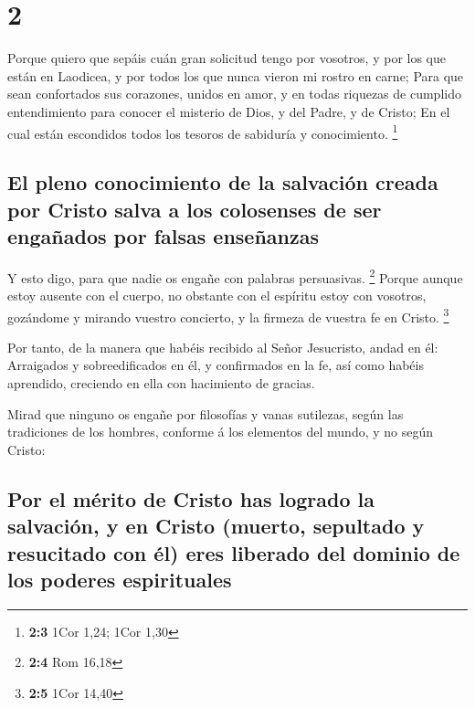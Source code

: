 \hypertarget{section-1}{%
\section{2}\label{section-1}}

 Porque quiero que sepáis cuán gran solicitud tengo por
vosotros, y por los que están en Laodicea, y por todos los que nunca
vieron mi rostro en carne;  Para que sean confortados sus
corazones, unidos en amor, y en todas riquezas de cumplido entendimiento
para conocer el misterio de Dios, y del Padre, y de Cristo; 
En el cual están escondidos todos los tesoros de sabiduría y
conocimiento. \footnote{\textbf{2:3} 1Cor 1,24; 1Cor 1,30}

\hypertarget{el-pleno-conocimiento-de-la-salvaciuxf3n-creada-por-cristo-salva-a-los-colosenses-de-ser-engauxf1ados-por-falsas-enseuxf1anzas}{%
\subsection{El pleno conocimiento de la salvación creada por Cristo
salva a los colosenses de ser engañados por falsas
enseñanzas}\label{el-pleno-conocimiento-de-la-salvaciuxf3n-creada-por-cristo-salva-a-los-colosenses-de-ser-engauxf1ados-por-falsas-enseuxf1anzas}}

 Y esto digo, para que nadie os engañe con palabras
persuasivas. \footnote{\textbf{2:4} Rom 16,18}  Porque
aunque estoy ausente con el cuerpo, no obstante con el espíritu estoy
con vosotros, gozándome y mirando vuestro concierto, y la firmeza de
vuestra fe en Cristo. \footnote{\textbf{2:5} 1Cor 14,40}

 Por tanto, de la manera que habéis recibido al Señor
Jesucristo, andad en él:  Arraigados y sobreedificados en
él, y confirmados en la fe, así como habéis aprendido, creciendo en ella
con hacimiento de gracias.

 Mirad que ninguno os engañe por filosofías y vanas
sutilezas, según las tradiciones de los hombres, conforme á los
elementos del mundo, y no según Cristo:

\hypertarget{por-el-muxe9rito-de-cristo-has-logrado-la-salvaciuxf3n-y-en-cristo-muerto-sepultado-y-resucitado-con-uxe9l-eres-liberado-del-dominio-de-los-poderes-espirituales}{%
\subsection{Por el mérito de Cristo has logrado la salvación, y en
Cristo (muerto, sepultado y resucitado con él) eres liberado del dominio
de los poderes
espirituales}\label{por-el-muxe9rito-de-cristo-has-logrado-la-salvaciuxf3n-y-en-cristo-muerto-sepultado-y-resucitado-con-uxe9l-eres-liberado-del-dominio-de-los-poderes-espirituales}}

